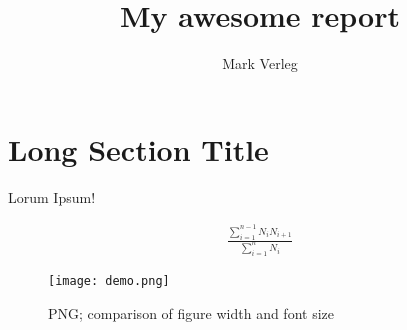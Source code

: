 \documentclass[a4paper,UTF8]{article}
\begin{document}
	
	\title{My awesome report}
	\author{Mark Verleg}
	\maketitle
	
	\section*{Long Section Title}
	
		
		Lorum Ipsum!

		\begin{align}
			\frac{\sum_{i=1}^{n-1}N_{i}N_{i+1}}{\sum_{i=1}^{n} N_{i}}
			\label{eq:equation_label}
		\end{align}

		\begin{figure}[ht]
			\texttt{[image: demo.png]}
			\caption{PNG; comparison of figure width and font size}
			\label{png_label}
		\end{figure}
\end{document}
